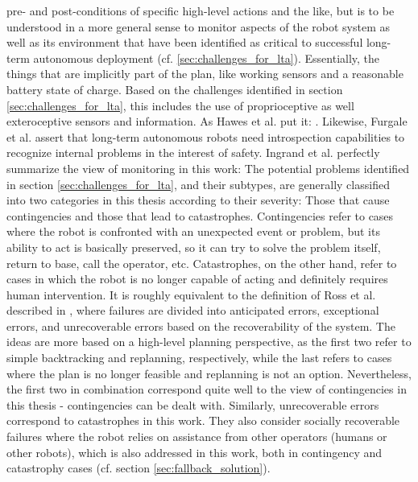 \documentclass[english, master, utf8]{base/thesis_KBS}
\begin{document}
pre- and post-conditions of specific high-level actions and the like, but is to be understood in a more general sense to monitor aspects of the robot system as well as its environment
that have been identified as critical to successful long-term autonomous deployment (cf. \ref{sec:challenges_for_lta}). Essentially, the things that are implicitly part of the plan,
like working sensors and a reasonable battery state of charge. \cite{Ingrand:2017} Based on the challenges identified in section \ref{sec:challenges_for_lta}, this includes the use of
proprioceptive as well exteroceptive sensors and information. As Hawes et al. put it: . \cite{Hawes:2017} Likewise, Furgale et al. assert that long-term autonomous robots need introspection capabilities to recognize internal problems in
the interest of safety. \cite{Furgale:2015} Ingrand et al. perfectly summarize the view of monitoring in this work:  \cite{Ingrand:2017}
The potential problems identified in section \ref{sec:challenges_for_lta}, and their subtypes, are generally classified into two categories in this thesis according to their
severity: Those that cause contingencies and those that lead to catastrophes. Contingencies refer to cases where the robot is confronted with an unexpected event or problem, but
its ability to act is basically preserved, so it can try to solve the problem itself, return to base, call the operator, etc. Catastrophes, on the other hand, refer to cases in which
the robot is no longer capable of acting and definitely requires human intervention. It is roughly equivalent to the definition of Ross et al. described in \cite{Honig:2018}, where
failures are divided into anticipated errors, exceptional errors, and unrecoverable errors based on the recoverability of the system. The ideas are more based on a high-level planning
perspective, as the first two refer to simple backtracking and replanning, respectively, while the last refers to cases where the plan is no longer feasible and replanning is not an
option. Nevertheless, the first two in combination correspond quite well to the view of contingencies in this thesis - contingencies can be dealt with. Similarly, unrecoverable errors
correspond to catastrophes in this work. They also consider socially recoverable failures where the robot relies on assistance from other operators (humans or other robots), which is
also addressed in this work, both in contingency and catastrophy cases (cf. section \ref{sec:fallback_solution}).
\end{document}
